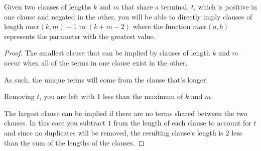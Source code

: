 \documentclass[manuscript]{acmart}
\begin{document}
    \begin{lemma}
        Given two clauses of lengths $k$ and $m$ that share a terminal, $t$, which is 
        positive in one clause and negated in the other, you will be able
        to directly imply clauses of length $max(k, m)-1$ to $(k + m - 2)$ where
        the function $max(a, b)$ represents the parameter with the greatest value.
    \end{lemma}
    \begin{proof}
        The smallest clause that can be implied by clauses of length $k$ and $m$
        occur when all of the terms in one clause exist in the other.

        As such, the unique terms will come from the clause that's longer.

        Removing $t$, you are left with 1 less than the maximum of $k$ and $m$.

        The largest clause can be implied if there are no terms shared between
        the two clauses. In this case you subtract $1$ from the length of each
        clause to account for $t$ and since no duplicates will be removed, the 
        resulting clause's length is $2$ less than the sum of the lengths of 
        the clauses.
    \end{proof}
\end{document}

